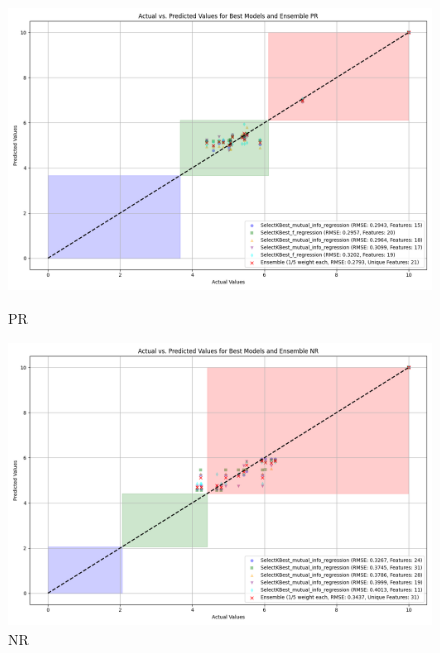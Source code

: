 \begin{figure}[H]
    \centering
    \begin{minipage}{0.45\textwidth}
        \centering
        \includegraphics[width=\linewidth]{reg_section_specific/images_reg_featred_ensemble/actual_vs_predicted_best_feature_selection_and_ensemble_PR.png}
        \caption{PR}
        \label{fig_reg_spec:pr_reg_featred_best_ensemble}
    \end{minipage}\hfill
    \begin{minipage}{0.45\textwidth}
        \centering
        \includegraphics[width=\linewidth]{reg_section_specific/images_reg_featred_ensemble/actual_vs_predicted_best_feature_selection_and_ensemble_NR.png}
        \caption{NR}
        \label{fig_reg_spec:nr_reg_featred_best_ensemble}
    \end{minipage}
\end{figure}

